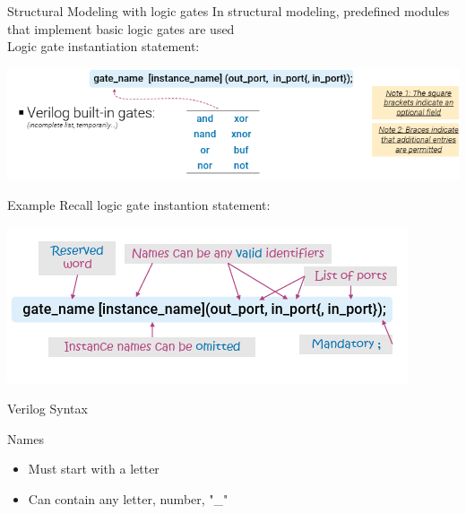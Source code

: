    \begin{parag}{Structural Modeling with logic gates}
       In structural modeling, predefined modules that implement basic logic gates are used\\
       Logic gate instantiation statement:
       \begin{center}
           \includegraphics[scale=0.8]{22025-03-20.png}
       \end{center}

       \begin{subparag}{Example}
           Recall logic gate instantion statement:
           \begin{center}
               \includegraphics[scale=0.6]{32025-03-20.png}
           \end{center}
           
           
       \end{subparag}
       

   
   \end{parag}
   
      \begin{parag}{Verilog Syntax}
          \begin{subparag}{Names}
             \begin{itemize}
                 \item 
              Must start with a letter
          \item Can contain any letter, number, "\_"
             \end{itemize} 
          \end{subparag}
      
      \end{parag}
     
